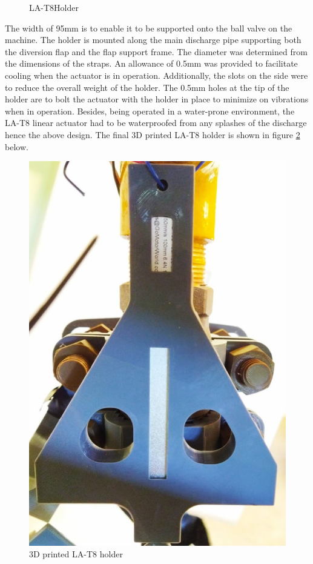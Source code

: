 \begin{itemize}
\begin{figure}[H]
        \caption{LA-T8Holder}
        \label{fig: LA-T8Holder}
        \end{figure}
The width of 95mm is to enable it to be supported onto the ball valve on the machine. The holder is mounted along the main discharge pipe supporting both the diversion flap and the flap support frame. The diameter was determined from the dimensions of the straps. An allowance of 0.5mm was provided to facilitate cooling when the actuator is in operation. Additionally, the slots on the side were to reduce the overall weight of the holder. The 0.5mm holes at the tip of the holder are to bolt the actuator with the holder in place to minimize on vibrations when in operation. Besides, being operated in a water-prone environment, the LA-T8 linear actuator had to be waterproofed from any splashes of the discharge hence the above design. The final 3D printed LA-T8 holder is shown in figure \ref{fig: 3D printed LA-T8 holder} below.
\begin{figure}[H]
        \centering
        \includegraphics [width=.60\textwidth] {Figures/laholder.jpg}
        \caption{3D printed LA-T8 holder}
        \label{fig: 3D printed LA-T8 holder}
        \end{figure}


\end{itemize}
